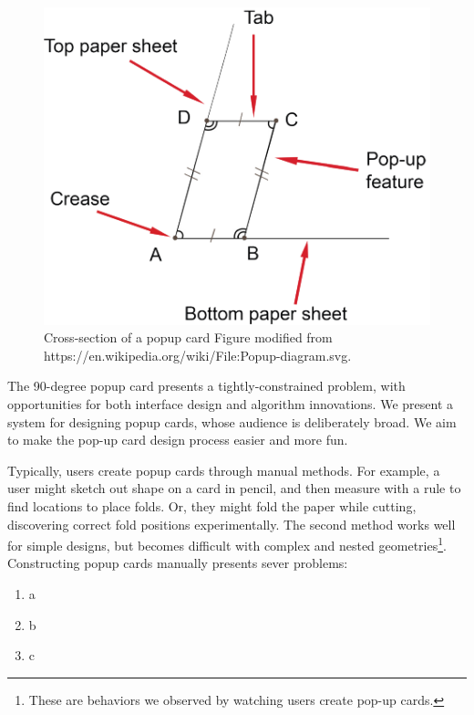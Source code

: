 \begin{figure}[htbp]
\centering
\includegraphics{figures/shared/01_Background/popup-diagram.pdf}
\caption{Cross-section of a popup card Figure modified from
https://en.wikipedia.org/wiki/File:Popup-diagram.svg.}
\end{figure}

The 90-degree popup card presents a tightly-constrained problem, with
opportunities for both interface design and algorithm innovations. We
present a system for designing popup cards, whose audience is
deliberately broad. We aim to make the pop-up card design process easier
and more fun.

Typically, users create popup cards through manual methods. For example,
a user might sketch out shape on a card in pencil, and then measure with
a rule to find locations to place folds. Or, they might fold the paper
while cutting, discovering correct fold positions experimentally. The
second method works well for simple designs, but becomes difficult with
complex and nested geometries\footnote{These are behaviors we observed
  by watching users create pop-up cards.}. Constructing popup cards
manually presents sever problems:

\begin{enumerate}
\def\labelenumi{\arabic{enumi}.}
\itemsep1pt\parskip0pt
\item
  a
\item
  b
\item
  c
\end{enumerate}
